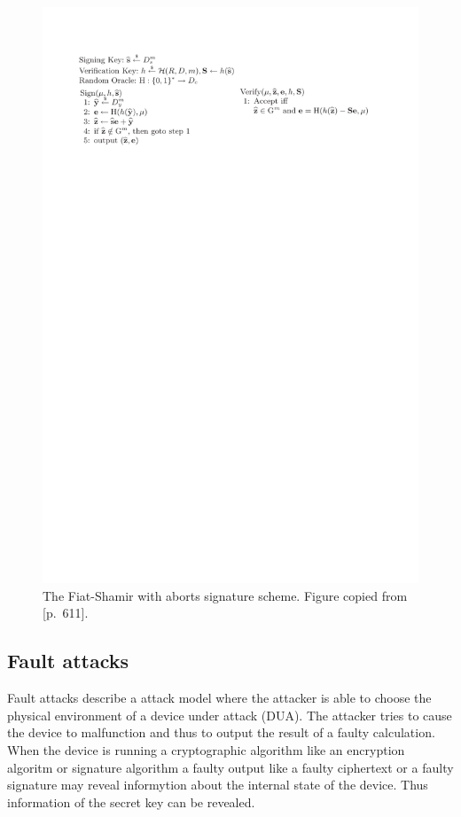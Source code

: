 \documentclass[a4paper,titlepage]{article}
\begin{document}
\begin{figure}[h]
\centering
\includegraphics[width=.99\linewidth,trim=40 500 55 54,clip,frame]{plots/loopabortsig}
\caption{The Fiat-Shamir with aborts signature scheme. Figure copied from \cite{fiatshamirabort}[p.~611].}
\label{fig:abortsig}
\end{figure}

\subsection{Fault attacks}
Fault attacks describe a attack model where the attacker is able to choose the physical environment of a device under attack (DUA). The attacker tries to cause the device to malfunction and thus to output the result of a faulty calculation. When the device is running a cryptographic algorithm like an encryption algoritm or signature algorithm a faulty output like a faulty ciphertext or a faulty signature may reveal informytion about the internal state of the device. Thus information of the secret key can be revealed.
\end{document}
